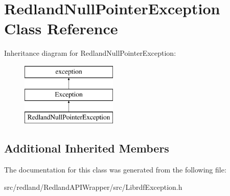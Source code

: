 \hypertarget{classRedlandNullPointerException}{}\section{Redland\+Null\+Pointer\+Exception Class Reference}
\label{classRedlandNullPointerException}
Inheritance diagram for Redland\+Null\+Pointer\+Exception\+:\begin{figure}[H]
\begin{center}
\leavevmode
\includegraphics[height=3.000000cm]{classRedlandNullPointerException}
\end{center}
\end{figure}
\subsection*{Additional Inherited Members}


The documentation for this class was generated from the following file\+:\begin{DoxyCompactItemize}
\item 
src/redland/\+Redland\+A\+P\+I\+Wrapper/src/Librdf\+Exception.\+h\end{DoxyCompactItemize}
